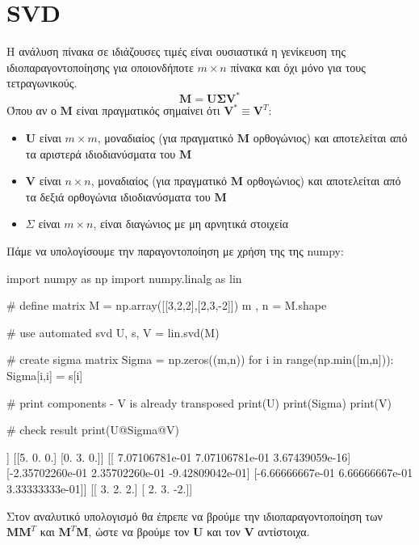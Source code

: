 \section{{\en SVD}}
Η ανάλυση πίνακα σε ιδιάζουσες τιμές είναι ουσιαστικά η γενίκευση της ιδιοπαραγοντοποίησης για οποιονδήποτε $m \times n$ πίνακα και όχι μόνο για τους τετραγωνικούς.
\begin{equation}
\mathbf{M}=\mathbf{U} \boldsymbol{\Sigma} \mathbf{V}^*
\end{equation}
Όπου αν ο $\mathbf{M}$ είναι πραγματικός σημαίνει ότι $\mathbf{V}^* \equiv \mathbf{V}^T$:
\begin{itemize}
\item $\mathbf{U}$ είναι $m \times m$, μοναδιαίος (για πραγματικό $\mathbf{M}$ ορθογώνιος) και αποτελείται από τα αριστερά ιδιοδιανύσματα του $\mathbf{M}$
\item $\mathbf{V}$ είναι $n \times n$, μοναδιαίος (για πραγματικό $\mathbf{M}$ ορθογώνιος)  και αποτελείται από τα δεξιά ορθογώνια ιδιοδιανύσματα του $\mathbf{M}$
\item $\Sigma$ είναι $m \times n$, είναι διαγώνιος με μη αρνητικά στοιχεία
\end{itemize}

Πάμε να υπολογίσουμε την παραγοντοποίηση με χρήση της της {\en numpy}:
\en
\begin{python}
import numpy as np
import numpy.linalg as lin

# define matrix
M = np.array([[3,2,2],[2,3,-2]])
m , n = M.shape

# use automated svd
U, s, V = lin.svd(M)

# create sigma matrix
Sigma = np.zeros((m,n))
for i in range(np.min([m,n])):
    Sigma[i,i] = s[i]

# print components - V is already transposed
print(U)
print(Sigma)
print(V)

# check result
print(U@Sigma@V)
\end{python}
\vspace*{-0.7cm}
\begin{codeout}
[[ 0.70710678 -0.70710678]
 [ 0.70710678  0.70710678]]
[[5. 0. 0.]
 [0. 3. 0.]]
[[ 7.07106781e-01  7.07106781e-01  3.67439059e-16]
 [-2.35702260e-01  2.35702260e-01 -9.42809042e-01]
 [-6.66666667e-01  6.66666667e-01  3.33333333e-01]]
[[ 3.  2.  2.]
 [ 2.  3. -2.]]
\end{codeout}
\gr
Στον αναλυτικό υπολογισμό θα έπρεπε να βρούμε την ιδιοπαραγοντοποίηση των $\mathbf{M} \mathbf{M}^{T}$ και $\mathbf{M}^{Τ} \mathbf{M}$, ώστε να βρούμε τον $\mathbf{U}$ και τον $\mathbf{V}$ αντίστοιχα.
